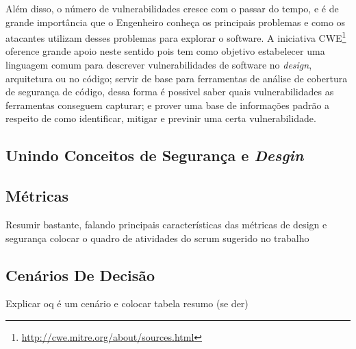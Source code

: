 Além disso, o número de vulnerabilidades cresce com o passar do tempo, e é de grande importância que o Engenheiro conheça os principais problemas e como os atacantes utilizam desses problemas para explorar o software. A iniciativa CWE\footnote{\url{http://cwe.mitre.org/about/sources.html}} oference grande apoio neste sentido pois tem como objetivo estabelecer uma linguagem comum para descrever vulnerabilidades de software no \emph{design}, arquitetura ou no código; servir de base para ferramentas de análise de cobertura de segurança de código, dessa forma é possivel saber quais vulnerabilidades as ferramentas conseguem capturar; e prover uma base de informações padrão a respeito de como identificar, mitigar e previnir uma certa vulnerabilidade.

\subsection{Unindo Conceitos de Segurança e \emph{Desgin}}
\subsection{Métricas}

Resumir bastante, falando principais características das métricas de design e segurança
colocar o quadro de atividades do scrum sugerido no trabalho

\subsection{Cenários De Decisão}
Explicar oq é um cenário e colocar tabela resumo (se der)


